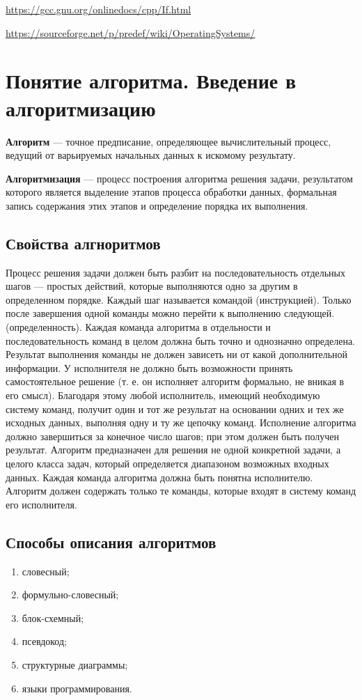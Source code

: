 \documentclass[14pt, a4paper]{extarticle}
\begin{document}
\url{https://gcc.gnu.org/onlinedocs/cpp/If.html}

\url{https://sourceforge.net/p/predef/wiki/OperatingSystems/}

\section{Понятие алгоритма. Введение в алгоритмизацию}
\textbf{Алгоритм} --- точное предписание, определяющее вычислительный процесс, ведущий от варьируемых
начальных данных к искомому результату.

\textbf{Алгоритмизация} --- процесс построения алгоритма решения задачи, результатом которого является
выделение этапов процесса обработки данных, формальная запись содержания этих этапов и определение
порядка их выполнения.

\subsection*{Свойства алгноритмов}
\begin{enumerate}
   Процесс решения задачи должен быть разбит на последовательность отдельных шагов — простых действий,
  которые выполняются одно за другим в определенном порядке. Каждый шаг называется командой (инструкцией).
  Только после завершения одной команды можно перейти к выполнению следующей.
   (определенность). Каждая команда алгоритма в отдельности и последовательность команд в
  целом должна быть точно и однозначно определена. Результат выполнения команды не должен зависеть ни от какой дополнительной
  информации. У исполнителя не должно быть возможности принять самостоятельное решение (т. е. он исполняет алгоритм формально,
  не вникая в его смысл).
  Благодаря этому любой исполнитель, имеющий необходимую систему команд, получит один и тот же результат на основании одних и
  тех же исходных данных, выполняя одну и ту же цепочку команд.
   Исполнение алгоритма должно завершиться за конечное число шагов;
  при этом должен быть получен результат.
   Алгоритм предназначен для решения не одной конкретной задачи, а целого класса задач, который определяется
  диапазоном возможных входных данных.
   Каждая команда алгоритма должна быть понятна исполнителю. Алгоритм должен содержать только те команды,
  которые входят в систему команд его исполнителя.
\end{enumerate}

\subsection*{Способы описания алгоритмов}
\begin{enumerate}
  \item словесный;
  \item формульно-словесный;
  \item блок-схемный;
  \item псевдокод;
  \item структурные диаграммы;
  \item языки программирования.
\end{enumerate}
\end{document}
